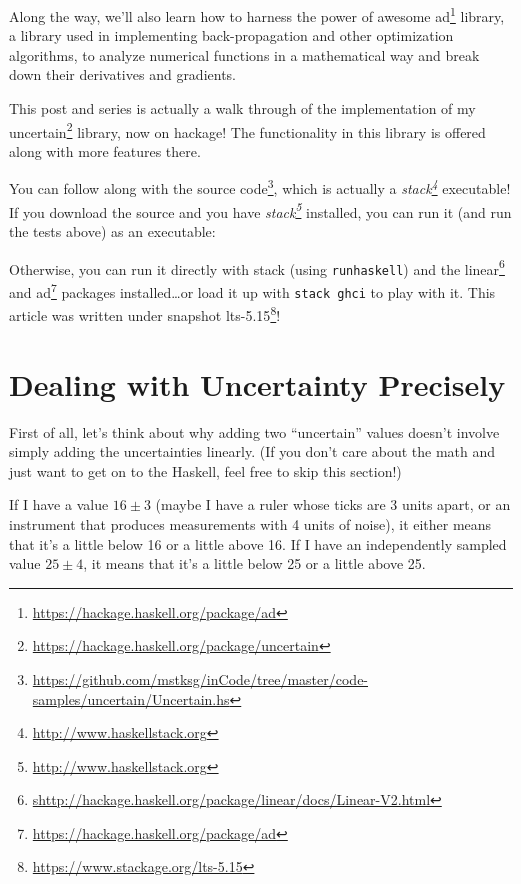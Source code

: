 \documentclass[]{article}
\newenvironment{Shaded}{}{}
\newcommand{\KeywordTok}[1]{\textcolor[rgb]{0.00,0.44,0.13}{\textbf{{#1}}}}
\newcommand{\NormalTok}[1]{{#1}}
\renewcommand{\href}[2]{#2\footnote{\url{#1}}}
\begin{document}
Along the way, we'll also learn how to harness the power of awesome
\href{https://hackage.haskell.org/package/ad}{ad} library, a library
used in implementing back-propagation and other optimization algorithms,
to analyze numerical functions in a mathematical way and break down
their derivatives and gradients.

This post and series is actually a walk through of the implementation of
my \href{https://hackage.haskell.org/package/uncertain}{uncertain}
library, now on hackage! The functionality in this library is offered
along with more features there.

You can follow along with
\href{https://github.com/mstksg/inCode/tree/master/code-samples/uncertain/Uncertain.hs}{the
source code}, which is actually a
\emph{\href{http://www.haskellstack.org}{stack}} executable! If you
download the source and you have
\emph{\href{http://www.haskellstack.org}{stack}} installed, you can run
it (and run the tests above) as an executable:

\begin{Shaded}
\end{Shaded}

Otherwise, you can run it directly with stack (using
\texttt{runhaskell}) and the
\href{shttp://hackage.haskell.org/package/linear/docs/Linear-V2.html}{linear}
and \href{https://hackage.haskell.org/package/ad}{ad} packages
installed\ldots{}or load it up with \texttt{stack\ ghci} to play with
it. This article was written under snapshot
\href{https://www.stackage.org/lts-5.15}{lts-5.15}!

\section{Dealing with Uncertainty
Precisely}\label{dealing-with-uncertainty-precisely}

First of all, let's think about why adding two ``uncertain'' values
doesn't involve simply adding the uncertainties linearly. (If you don't
care about the math and just want to get on to the Haskell, feel free to
skip this section!)

If I have a value \(16 \pm 3\) (maybe I have a ruler whose ticks are 3
units apart, or an instrument that produces measurements with 4 units of
noise), it either means that it's a little below 16 or a little above
16. If I have an independently sampled value \(25 \pm 4\), it means that
it's a little below 25 or a little above 25.
\end{document}
